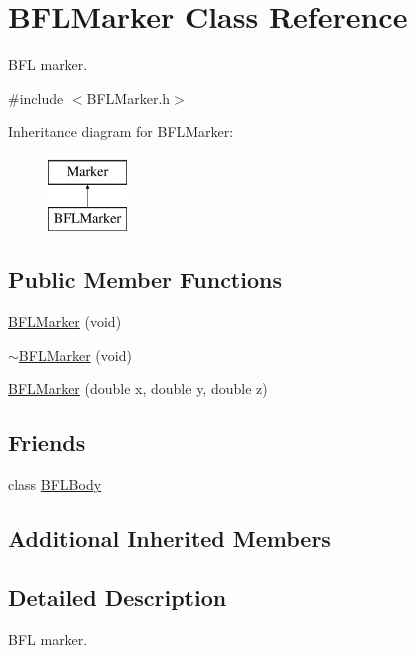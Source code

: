 \hypertarget{class_b_f_l_marker}{}\section{B\+F\+L\+Marker Class Reference}
\label{class_b_f_l_marker}


B\+FL marker.  




{\ttfamily \#include $<$B\+F\+L\+Marker.\+h$>$}

Inheritance diagram for B\+F\+L\+Marker\+:\begin{figure}[H]
\begin{center}
\leavevmode
\includegraphics[height=2.000000cm]{class_b_f_l_marker}
\end{center}
\end{figure}
\subsection*{Public Member Functions}
\begin{DoxyCompactItemize}
\item 
\hyperlink{class_b_f_l_marker_a5d6b8e4b1cfac580b86aa0f3b2f22c24}{B\+F\+L\+Marker} (void)
\item 
\hyperlink{class_b_f_l_marker_a10ac169924a35ee14599992290540447}{$\sim$\+B\+F\+L\+Marker} (void)
\item 
\hyperlink{class_b_f_l_marker_a2ec501d3d93f2dbde8e56e6155ef3c09}{B\+F\+L\+Marker} (double x, double y, double z)
\end{DoxyCompactItemize}
\subsection*{Friends}
\begin{DoxyCompactItemize}
\item 
class \hyperlink{class_b_f_l_marker_a253e046b9808d9a35fda96a16d22edb3}{B\+F\+L\+Body}
\end{DoxyCompactItemize}
\subsection*{Additional Inherited Members}


\subsection{Detailed Description}
B\+FL marker. 

